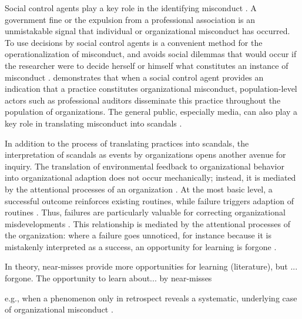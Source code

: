 Social control agents play a key role in the identifying misconduct \citep{Greve2010, Palmer2008, Schnatterly2018}. A government fine or the expulsion from a professional association is an unmistakable signal that individual or organizational misconduct has occurred. To use decisions by social control agents is a convenient method for the operationalization of misconduct, and avoids social dilemmas that would occur if the researcher were to decide herself or himself what constitutes an instance of misconduct \citep[e.g.,][]{Pontikes2010}. \citet{Mohliver2019} demonstrates that when a social control agent provides an indication that a practice constitutes organizational misconduct, population-level actors \citet{Madsen2018} such as professional auditors disseminate this practice throughout the population of organizations. The general public, especially media, can also play a key role in translating misconduct into scandals \citet{Piazza2018, Hoffman1999}.

In addition to the process of translating practices into scandals, the interpretation of scandals as events by organizations opens another avenue for inquiry. The translation of environmental feedback to organizational behavior into organizational adaption \citep{Cyert1963} does not occur mechanically; instead, it is mediated by the attentional processes of an organization \citep{Hoffman2001, Ocasio1997}. At the most basic level, a successful outcome reinforces existing routines, while failure triggers adaption of routines \citep{Levitt1988}. Thus, failures are particularly valuable for correcting organizational misdevelopments \citep{March1992}. This relationship is mediated by the attentional processes of the organization: where a failure goes unnoticed, for instance because it is mistakenly interpreted as a success, an opportunity for learning is forgone \citep[p. 457]{Madsen2010}.



In theory, near-misses provide more opportunities for learning (literature), but ...  forgone.
The opportunity to learn about... by near-misses


e.g., when a phenomenon only in retrospect reveals a systematic, underlying case of organizational misconduct \citet{Piazza2018}.